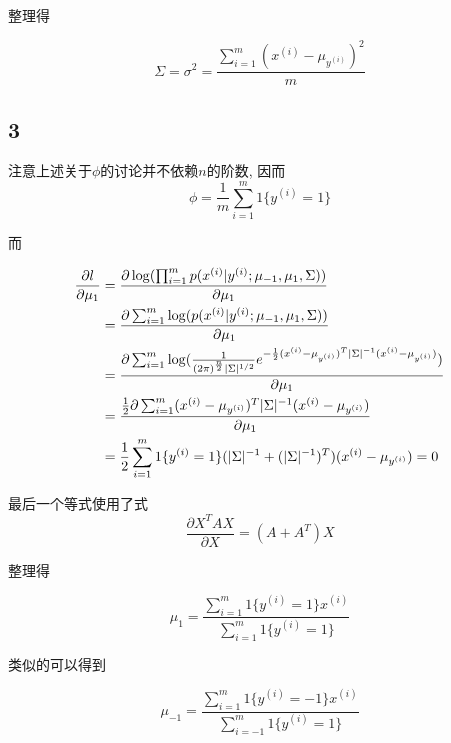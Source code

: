 \documentclass{ctexart}
\begin{document}
整理得

\begin{equation}
	\Sigma = \sigma^2 = \frac{\sum_{i=1}^m(x^{(i)} - \mu_{y^{(i)}})^2}{m}
\end{equation}

\subsection{3}

注意上述关于$\phi$的讨论并不依赖$n$的阶数, 因而
\begin{equation}
\phi = \frac{1}{m} \sum_{i=1}^m 1\{y^{(i)} = 1\}
\end{equation}

而

\begin{align*}
\frac{\partial l}{\partial \mu_1} &= \frac{\partial \log(\prod_{i=1}^m p(x^{(i)}|y^{(i)};\mu_{-1},\mu_1,\Sigma))}{\partial \mu_1} \notag \\
&=  \frac{\partial \sum_{i=1}^m\log( p(x^{(i)}|y^{(i)};\mu_{-1},\mu_1,\Sigma))}{\partial \mu_1} \notag \\
&=  \frac{\partial \sum_{i=1}^m\log(\frac{1}{(2\pi)^{\frac{n}{2}}|\Sigma|^{1/2}}e^{-\frac{1}{2}(x^{(i)}-\mu_{y^{(i)}})^T |\Sigma|^{-1} (x^{(i)}-\mu_{y^{(i)}})})}{\partial \mu_1} \notag \\
&=  \frac{\frac{1}{2}\partial \sum_{i=1}^m (x^{(i)}-\mu_{y^{(i)}})^T |\Sigma|^{-1} (x^{(i)}-\mu_{y^{(i)}})}{\partial \mu_1} \notag \\
&= \frac{1}{2}\sum_{i=1}^m 1\{y^{(i)} = 1\}(|\Sigma|^{-1} + (|\Sigma|^{-1})^T)(x^{(i)} - \mu_{y^{(i)}}) = 0
\end{align*}

最后一个等式使用了式
\begin{equation*}
\frac{\partial X^TAX}{\partial X} = (A + A^T)X
\end{equation*}

整理得

\begin{equation}
 	\mu_{1} = \frac{\sum_{i=1}^m 1\{y^{(i)} = 1\} x^{(i)}}{\sum_{i=1}^m 1\{y^{(i)} = 1\}}
\end{equation}

类似的可以得到

\begin{equation}
\mu_{-1} = \frac{\sum_{i=1}^m 1\{y^{(i)} = -1\} x^{(i)}}{\sum_{i=-1}^m 1\{y^{(i)} = 1\}}
\end{equation}
\end{document}
